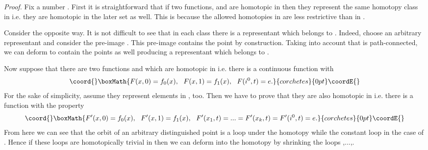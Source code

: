 \documentclass[a4paper,12pt,draft]{article}
\begin{document}
 
{\it Proof.} Fix a number \coordHE{}. First it is straightforward that if
two functions, \coordHE{} and \coordHE{} are homotopic in \myHighlight{$\left[
(W_k, x_1,...,x_k, i^0), (G,e)\right]$}\coordHE{} then they represent
the same homotopy class in \myHighlight{$\left[ (W_k, i^0), (G,e)\right]$}\coordHE{}
i.e. they are homotopic in the later set as well. This is because the
allowed homotopies in \myHighlight{$\left[ (W_k, i^0), (G,e)\right]$}\coordHE{} are
less restrictive than in \myHighlight{$\left[ (W_k, x_1,...,x_k, i^0), (G,e)\right]$}\coordHE{}. 

Consider the opposite way. It is not difficult to see that in each class
\myHighlight{$[f]\in\left[ (W_k, i^0), (G,e)\right]$}\coordHE{}
there is a representant which belongs to \myHighlight{$\left[ (W_k, 
x_1,...,x_k, i^0), (G,e)\right]$}\coordHE{}. Indeed, choose an arbitrary representant
\coordHE{}
and consider the pre-image \coordHE{}. This
pre-image contains the point \coordHE{} by construction.
Taking into account that \coordHE{} is path-connected, we can 
deform \coordHE{} to contain the points \coordHE{} as well
producing a representant which belongs to \myHighlight{$\left[ (W_k, x_1,...,x_k, i^0), 
(G,e)\right]$}\coordHE{}. 

Now suppose that there are two functions \coordHE{} and \coordHE{}
which are homotopic in \myHighlight{$\left[ (W_k, i^0), (G,e)\right]$}\coordHE{} i.e.
there is a continuous function \coordHE{} with
\[\coord{}\boxMath{F(x, 0)=f_0(x),\:\:\:F(x,1)=f_1(x),\:\:\:F(i^0, t)=e.}{corchetes}{0pt}\coordE{}\]
For the sake of simplicity, assume they represent elements in \myHighlight{$\left[
(W_k, x_1,...,x_k, i^0), (G,e)\right]$}\coordHE{}, too. Then we have to
prove that they are also homotopic in \myHighlight{$\left[ (W_k, 
x_1,...,x_k, i^0), (G,e)\right]$}\coordHE{} i.e. there is a function \coordHE{} with the property
\[\coord{}\boxMath{F'(x,0)=f_0(x),\:\:\:F'(x,1)=f_1(x),\:\:\:F'(x_1,t)=...=F'(x_k,t)=F'(i^0, 
t)=e.}{corchetes}{0pt}\coordE{}\]
From here we can see that the orbit of an arbitrary distinguished point
\coordHE{} is a loop \coordHE{} under the homotopy \coordHE{} while
the constant loop in the case of \coordHE{}. Hence if these loops are
homotopically trivial in \coordHE{} then we can deform \coordHE{} into the homotopy \coordHE{}
by shrinking the loops \coordHE{},...,\coordHE{}.
\end{document}
